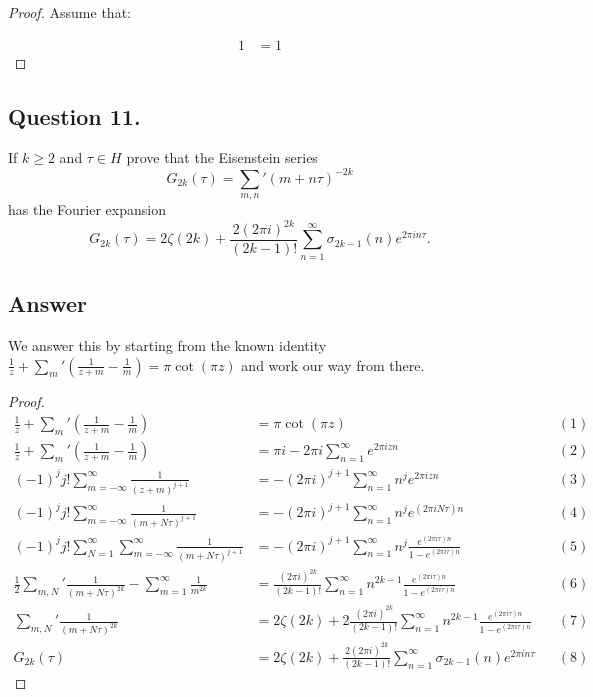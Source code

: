 \begin{proof}
    Assume that:

    \begin{align*}
        1 &= 1
    \end{align*}

\end{proof}


\subsection{Question 11.}
\noindent
If $k \geq 2$ and $\tau \in H$ prove that the Eisenstein series
\[
    G_{2k}(\tau) = \sum_{m,n}{'}(m + n\tau)^{-2k}
\]
has the Fourier expansion
\[
    G_{2k}(\tau) = 2\zeta(2k) +\frac{2(2 \pi i)^{2k}}{(2k-1)!}\sum_{n=1}^{\infty}\sigma_{2k-1}(n)e^{2\pi i n \tau}.
\]

\subsection*{Answer}
\noindent
We answer this by starting from the known identity
$
    \frac{1}{z} + \sum_m{'} ( \frac{1}{z+m} - \frac{1}{m} ) = \pi \cot(\pi z)
$
and work our way from there.

\begin{proof}
    \begin{align*}
        \frac{1}{z} + \sum_m{'} ( \frac{1}{z+m} - \frac{1}{m} ) &= \pi \cot(\pi z) &&(1)\\
        \frac{1}{z} + \sum_m{'} ( \frac{1}{z+m} - \frac{1}{m} ) &= \pi i -2 \pi i \sum_{n=1}^\infty e^{2 \pi i z n} &&(2)\\
        (-1)^j j! \sum_{m=-\infty}^{\infty} \frac{1}{(z+m)^{j+1}} &= -(2 \pi i)^{j+1} \sum_{n=1}^\infty n^j e^{2 \pi i z n} &&(3)\\
        (-1)^j j! \sum_{m=-\infty}^{\infty} \frac{1}{(m+N\tau)^{j+1}} &= -(2 \pi i)^{j+1} \sum_{n=1}^\infty n^j e^{(2 \pi i N\tau) n} &&(4)\\
        (-1)^j j! \sum_{N=1}^{\infty} \sum_{m=-\infty}^{\infty} \frac{1}{(m+N\tau)^{j+1}} &= -(2 \pi i)^{j+1} \sum_{n=1}^\infty n^j \frac{e^{(2 \pi i \tau)n}}{1-e^{(2 \pi i \tau)n}} &&(5)\\
        \frac{1}{2} \sum_{m,N}{'} \frac{1}{(m+N\tau)^{2k}} - \sum_{m=1}^\infty \frac{1}{m^{2k}} &= \frac{(2 \pi i)^{2k}}{(2k-1)!} \sum_{n=1}^\infty n^{2k-1} \frac{e^{(2 \pi i \tau)n}}{1-e^{(2 \pi i \tau)n}} &&(6)\\
        \sum_{m,N}{'} \frac{1}{(m+N\tau)^{2k}} &= 2\zeta(2k) + 2 \frac{(2 \pi i)^{2k}}{(2k-1)!} \sum_{n=1}^\infty n^{2k-1} \frac{e^{(2 \pi i \tau)n}}{1-e^{(2 \pi i \tau)n}} &&(7)\\
        G_{2k}(\tau) &= 2\zeta(2k) +\frac{2(2 \pi i)^{2k}}{(2k-1)!}\sum_{n=1}^{\infty}\sigma_{2k-1}(n)e^{2\pi i n \tau} &&(8)
    \end{align*}

\end{proof}

